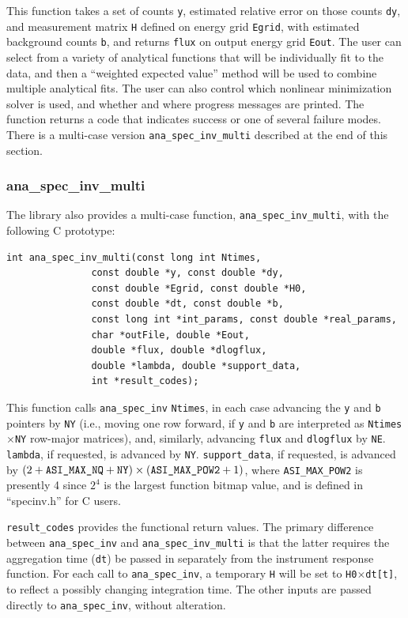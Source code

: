 \documentclass{article}    %
\begin{document}
This function takes a set of counts \verb|y|, estimated relative error
on those counts \verb|dy|, and measurement matrix \verb|H| defined on
energy grid \verb|Egrid|, with estimated background counts \verb|b|,
and returns \verb|flux| on output energy grid \verb|Eout|. The user
can select from a variety of analytical functions that will be
individually fit to the data, and then a ``weighted expected value''
method will be used to combine multiple analytical fits. The user can
also control which nonlinear minimization solver is used, and whether
and where progress messages are printed. The function returns a code
that indicates success or one of several failure modes. There is a
multi-case version \verb|ana_spec_inv_multi| described at the end of
this section.

\subsubsection{ana\_spec\_inv\_multi}

The library also provides a multi-case function,
\verb|ana_spec_inv_multi|, with the following C prototype:
\begin{verbatim}
int ana_spec_inv_multi(const long int Ntimes,
		       const double *y, const double *dy, 
		       const double *Egrid, const double *H0, 
		       const double *dt, const double *b,
		       const long int *int_params, const double *real_params,
		       char *outFile, double *Eout, 
		       double *flux, double *dlogflux, 
		       double *lambda, double *support_data, 
		       int *result_codes);
\end{verbatim}
This function calls \verb|ana_spec_inv| \verb|Ntimes|, in each case
advancing the \verb|y| and \verb|b| pointers by \verb|NY| (i.e.,
moving one row forward, if \verb|y| and \verb|b| are interpreted as
\verb|Ntimes|$\times$\verb|NY| row-major matrices), and, similarly,
advancing \verb|flux| and \verb|dlogflux| by
\verb|NE|. \verb|lambda|, if requested, is advanced by \verb|NY|.
\verb|support_data|, if requested, is advanced by $(2+\verb|ASI_MAX_NQ|+\verb|NY|)\times(\verb|ASI_MAX_POW2|+1)$,
where \verb|ASI_MAX_POW2| is presently 4 since $2^4$ is the largest
function bitmap value, and is defined in ``specinv.h'' for C users.

\verb|result_codes| provides the functional return values.
The primary difference between \verb|ana_spec_inv| and
\verb|ana_spec_inv_multi| is that the latter requires
the aggregation time (\verb|dt|) be passed in separately from the
instrument response function. For each call to \verb|ana_spec_inv|, a
temporary \verb|H| will be set to \verb|H0|$\times$\verb|dt[t]|, to
reflect a possibly changing integration time. The other inputs
are passed directly to \verb|ana_spec_inv|, without alteration.
\end{document}
